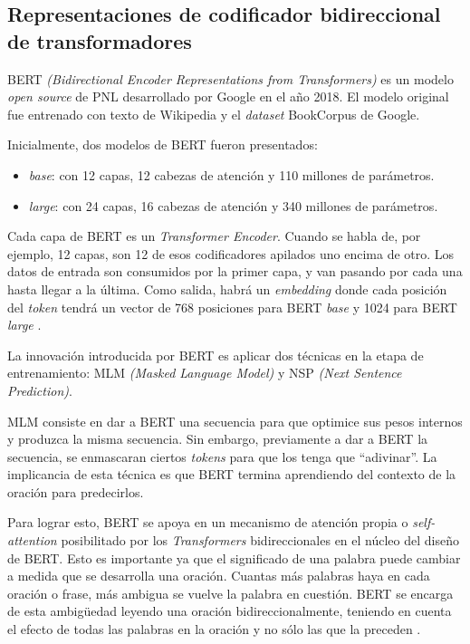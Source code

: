 \subsection{Representaciones de codificador bidireccional de transformadores}

BERT \textit{(Bidirectional Encoder Representations from Transformers)} es un modelo \textit{open source} de PNL desarrollado por Google en el año 2018. El modelo original fue entrenado con texto de Wikipedia y el \textit{dataset} BookCorpus de Google.

Inicialmente, dos modelos de BERT fueron presentados:
\begin{itemize}
	\item \textit{base}: con 12 capas, 12 cabezas de atención y 110 millones de parámetros.
	\item \textit{large}: con 24 capas, 16 cabezas de atención y 340 millones de parámetros.
\end{itemize}

Cada capa de BERT es un \textit{Transformer Encoder}. Cuando se habla de, por ejemplo, 12 capas, son 12 de esos codificadores apilados uno encima de otro. Los datos de entrada son consumidos por la primer capa, y van pasando por cada una hasta llegar a la última. Como salida, habrá un \textit{embedding} donde cada posición del \textit{token} tendrá un vector de 768 posiciones para BERT \textit{base} y 1024 para BERT \textit{large} \citep{WEBSITE:20}.

La innovación introducida por BERT es aplicar dos técnicas en la etapa de entrenamiento: MLM \textit{(Masked Language Model)} y NSP \textit{(Next Sentence Prediction)}. 

MLM consiste en dar a BERT una secuencia para que optimice sus pesos internos y produzca la misma secuencia. Sin embargo, previamente a dar a BERT la secuencia, se enmascaran ciertos \textit{tokens} para que los tenga que ``adivinar''. La implicancia de esta técnica es que BERT termina aprendiendo del contexto de la oración para predecirlos.

Para lograr esto, BERT se apoya en un mecanismo de atención propia o \textit{self-attention} posibilitado por los \textit{Transformers} bidireccionales en el núcleo del diseño de BERT. Esto es importante ya que el significado de una palabra puede cambiar a medida que se desarrolla una oración. Cuantas más palabras haya en cada oración o frase, más ambigua se  vuelve la palabra en cuestión. BERT se encarga de esta ambigüedad leyendo una oración bidireccionalmente, teniendo en cuenta el efecto de todas las palabras en la oración y no sólo las que la preceden \citep{WEBSITE:21}.

